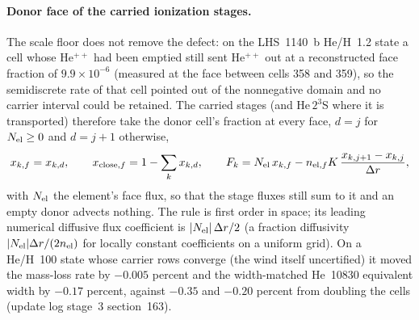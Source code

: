 \paragraph{Donor face of the carried ionization stages.}  The scale floor
does not remove the defect: on the LHS~1140~b He/H~1.2 state a cell whose
He$^{++}$ had been emptied still sent He$^{++}$ out at a reconstructed face
fraction of $9.9\times10^{-6}$ (measured at the face between cells 358 and
359), so the semidiscrete rate of that cell pointed out of the nonnegative
domain and no carrier interval could be retained.  The carried stages (and
He\,$2^3$S where it is transported) therefore take the donor cell's
fraction at every face, $d=j$ for $N_{\rm el}\ge0$ and $d=j+1$ otherwise,
%
\begin{equation}
  x_{k,f} = x_{k,d}, \qquad x_{{\rm close},f} = 1-\sum_k x_{k,d}, \qquad
  F_k = N_{\rm el}\,x_{k,f}
      - n_{{\rm el},f} K\,\frac{x_{k,j+1}-x_{k,j}}{\Delta r},
  \label{eq:stage_donor_face}
\end{equation}
%
with $N_{\rm el}$ the element's face flux, so that the stage fluxes still
sum to it and an empty donor advects nothing.  The rule is first order in
space; its leading numerical diffusive flux coefficient is
$|N_{\rm el}|\,\Delta r/2$ (a fraction diffusivity
$|N_{\rm el}|\Delta r/(2n_{\rm el})$ for locally constant coefficients on a
uniform grid).  On a He/H~100 state whose carrier rows converge (the wind
itself uncertified) it moved the mass-loss rate
by $-0.005$ percent and the width-matched He~10830 equivalent width by
$-0.17$ percent, against $-0.35$ and $-0.20$ percent from doubling the
cells (update log stage~3 section~163).

